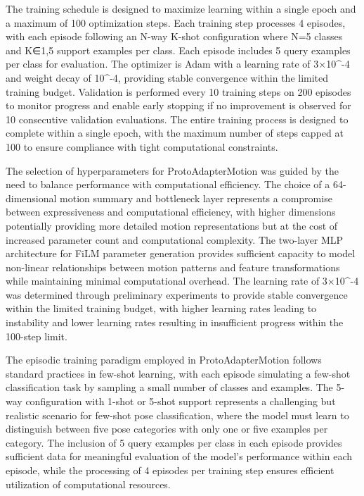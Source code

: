 \documentclass[11pt]{article}
\begin{document}
The training schedule is designed to maximize learning within a single epoch and a maximum of 100 optimization steps. Each training step processes 4 episodes, with each episode following an N-way K-shot configuration where N=5 classes and K∈{1,5} support examples per class. Each episode includes 5 query examples per class for evaluation. The optimizer is Adam with a learning rate of 3×10^-4 and weight decay of 10^-4, providing stable convergence within the limited training budget. Validation is performed every 10 training steps on 200 episodes to monitor progress and enable early stopping if no improvement is observed for 10 consecutive validation evaluations. The entire training process is designed to complete within a single epoch, with the maximum number of steps capped at 100 to ensure compliance with tight computational constraints.

The selection of hyperparameters for ProtoAdapterMotion was guided by the need to balance performance with computational efficiency. The choice of a 64-dimensional motion summary and bottleneck layer represents a compromise between expressiveness and computational efficiency, with higher dimensions potentially providing more detailed motion representations but at the cost of increased parameter count and computational complexity. The two-layer MLP architecture for FiLM parameter generation provides sufficient capacity to model non-linear relationships between motion patterns and feature transformations while maintaining minimal computational overhead. The learning rate of 3×10^-4 was determined through preliminary experiments to provide stable convergence within the limited training budget, with higher learning rates leading to instability and lower learning rates resulting in insufficient progress within the 100-step limit.

The episodic training paradigm employed in ProtoAdapterMotion follows standard practices in few-shot learning, with each episode simulating a few-shot classification task by sampling a small number of classes and examples. The 5-way configuration with 1-shot or 5-shot support represents a challenging but realistic scenario for few-shot pose classification, where the model must learn to distinguish between five pose categories with only one or five examples per category. The inclusion of 5 query examples per class in each episode provides sufficient data for meaningful evaluation of the model's performance within each episode, while the processing of 4 episodes per training step ensures efficient utilization of computational resources.
\end{document}
